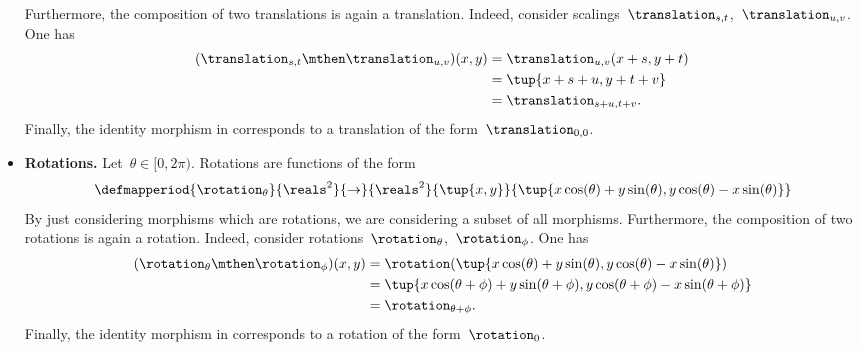 \begin{solution}
\begin{itemize}
              Furthermore, the composition of two translations is again a translation.
              Indeed, consider scalings~$\translation_{s,t}$,~$\translation_{u,v}$.
              One has
              \begin{equation*}
                  \begin{aligned}
                      (\translation_{s,t}\mthen \translation_{u,v})(x,y) & =\translation_{u,v}(x+s, y+t) \\
                                                                         & =\tup{x+s+u, y+t+v} \\
                                                                         & =\translation_{s+u,t+v}.
                  \end{aligned}
              \end{equation*}
              Finally, the identity morphism in \Draw corresponds to a translation of the form~$\translation_{0,0}$.
        \item \textbf{Rotations.}
              Let~$\theta \in [0,2\pi)$.
              Rotations are functions of the form
              \begin{equation*}
                  \defmapperiod{\rotation_{\theta}}{\reals^2}{\to}{\reals^2}{\tup{x,y}}{\tup{x\cos(\theta)+y\sin(\theta), y\cos(\theta)-x\sin(\theta)}}
              \end{equation*}
              By just considering morphisms which are rotations, we are considering a subset of all morphisms.
              Furthermore, the composition of two rotations is again a rotation.
              Indeed, consider rotations~$\rotation_{\theta}$,~$\rotation_{\phi}$.
              One has
              \begin{equation*}
                  \begin{aligned}
                      (\rotation_{\theta}\mthen \rotation_{\phi})(x,y) & =\rotation(\tup{x\cos(\theta)+y\sin(\theta), y\cos(\theta)-x\sin(\theta)}) \\
                                                                       & =\tup{x\cos(\theta+\phi)+y\sin(\theta+\phi), y\cos(\theta+\phi)-x\sin(\theta+\phi)} \\
                                                                       & =\rotation_{\theta+\phi}.
                  \end{aligned}
              \end{equation*}
              Finally, the identity morphism in \Draw corresponds to a rotation of the form~$\rotation_{0}$.

\end{itemize}
\end{solution}

